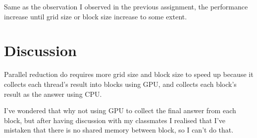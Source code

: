 \documentclass{article}
\begin{document}
	Same as the observation I observed in the previous assignment, the performance increase until grid size or block size increase to some extent. 
	
	\section{Discussion}
	Parallel reduction do requires more grid size and block size to speed up because it collects each thread's result into blocks using GPU, and collects each block's result as the answer using CPU. 
	
	I've wondered that why not using GPU to collect the final answer from each block, but after having discussion with my classmates I realised that I've mistaken that there is no shared memory between block, so I can't do that. 
	
\end{document}
